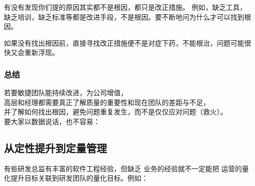 
有没有发现你们提的原因其实都不是根因，都只是改正措施。
例如，缺乏工具，缺乏培训，缺乏标准等都是改进手段，不是根因。要不断地问为什么才可以找到根因。

如果没有找出根因前，直接寻找改正措施便不是对症下药，不能根治，问题可能很快又会重新浮现。

\hypertarget{ux603bux7ed3}{%
\subsubsection{总结}\label{ux603bux7ed3}}

若要敏捷团队能持续改进，为公司增值，\\
高层和经理都需要真正了解质量的重要性和现在团队的差距与不足，\\
并了解如何找出根因，避免问题重复发生，而不是仅仅应对问题（救火）。\\
要大家以数据说话，也不容易：

\hypertarget{ux4eceux5b9aux6027ux63d0ux5347ux5230ux5b9aux91cfux7ba1ux7406}{%
\subsection{从定性提升到定量管理}\label{ux4eceux5b9aux6027ux63d0ux5347ux5230ux5b9aux91cfux7ba1ux7406}}

有些研发总监有丰富的软件工程经验，但缺乏 业务的经验就不一定能把
运营的量化提升目标关联到研发团队的量化目标。例如：

